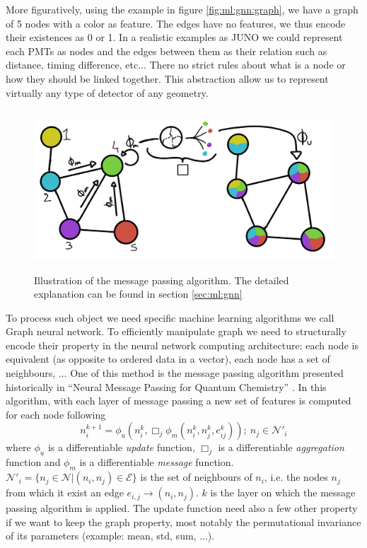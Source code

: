 \documentclass[../main.tex]{subfiles}
\begin{document}
More figuratively, using the example in figure \ref{fig:ml:gnn:graph}, we have a graph of 5 nodes with a color as feature. The edges have no features, we thus encode their existences as 0 or 1. In a realistic examples as JUNO we could represent each PMTs as nodes and the edges between them as their relation such as distance, timing difference, etc... There no strict rules about what is a node or how they should be linked together. This abstraction allow us to represent virtually any type of detector of any geometry.

\begin{figure}[ht]
  \centering
  \includegraphics[height=6cm]{images/ml/message_passing.png}
  \caption{Illustration of the message passing algorithm. The detailed explanation can be found in section \ref{sec:ml:gnn}}
  \label{fig:ml:gnn:message_passing}
\end{figure}

To process such object we need specific machine learning algorithms we call Graph neural network.
To efficiently manipulate graph we need to structurally encode their property in the neural network computing architecture: each node is equivalent (as opposite to ordered data in a vector), each node has a set of neighbours, ... One of this method is the message passing algorithm presented historically in ``Neural Message Passing for Quantum Chemistry'' \cite{gilmer_neural_2017}. In this algorithm, with each layer of message passing a new set of features is computed for each node following
\begin{equation}
  n_i^{k+1} = \phi_u (n_i^k, \Box_j \phi_m(n_i^k, n_j^k, e^k_{ij})); ~ n_j \in \mathcal{N}'_i
\end{equation}
where $\phi_u$ is a differentiable \textit{update} function, $\Box_j$ is a differentiable \textit{aggregation} function and $\phi_m$ is a differentiable \textit{message} function. $\mathcal{N}'_i = \{n_j \in \mathcal{N} | (n_i, n_j) \in \mathcal{E}\}$ is the set of neighbours of $n_i$, i.e. the nodes $n_j$ from which it exist an edge $e_{i,j} \rightarrow (n_i, n_j)$. $k$ is the layer on which the message passing algorithm is applied. The update function need also a few other property if we want to keep the graph property, most notably the permutational invariance of its parameters (example: mean, std, sum, ...).
\end{document}
